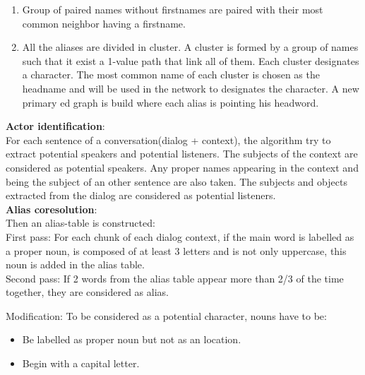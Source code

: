 \documentclass[a4paper, 12pt]{report}
\begin{document}
\begin{enumerate}
    \item Group of paired names without firstnames are paired with their most common neighbor having a firstname. 
    
    \item All the aliases are divided in cluster. A cluster is formed by a group of names such that it exist a 1-value path that link all of them. Each cluster designates a character. The most common name of each cluster is chosen as the headname and will be used in the network to designates the character. 
    A new  primary ed graph is build where each alias is pointing his headword. 
\end{enumerate}



\textbf{Actor identification}:\\
For each sentence of a conversation(dialog + context), the algorithm try to extract potential speakers and potential listeners.
The subjects of the context are considered as potential speakers. Any proper names appearing in the context and being the subject of an other sentence are also taken. The subjects and objects extracted from the dialog are considered as potential listeners.
\\
\textbf{Alias coresolution}:\\
Then an alias-table is constructed:\\
First pass: For each chunk of each dialog context, if the main word is labelled as a proper noun, is composed of at least 3 letters and is not only uppercase, this noun is added in the alias table.\\
Second pass: If 2 words from the alias table appear more than 2/3 of the time together, they are considered as alias.



Modification:
To be considered as a potential character, nouns have to be:
\begin{itemize}
    \item Be labelled as proper noun but not as an location.
    \item Begin with a capital letter.
\end{itemize}


 
\end{document}
